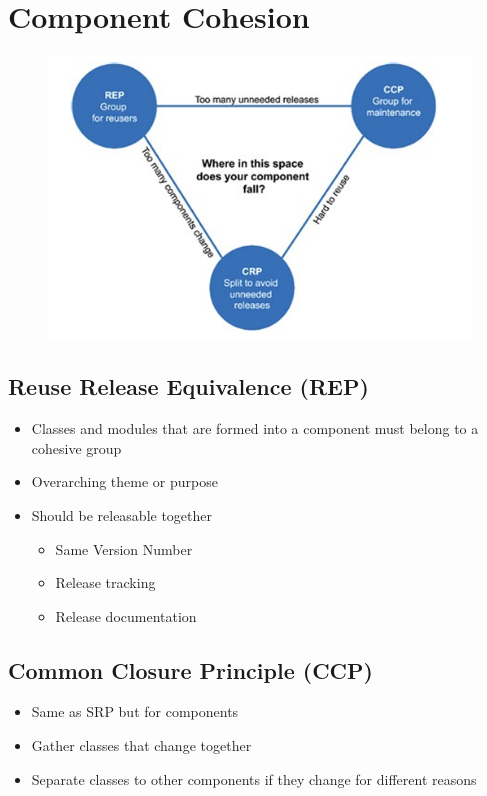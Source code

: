 \documentclass[../Main.tex]{subfiles}
\begin{document}
\section{Component Cohesion}
\begin{figure}[H]
    \centering
    \includegraphics[width=0.75\linewidth]{Images/cleanarch/component-cohesion.png}
\end{figure}

\subsection{Reuse Release Equivalence (REP)}
\begin{itemize}
    \item Classes and modules that are formed into a component must belong to a cohesive group
    \item Overarching theme or purpose
    \item Should be releasable together
        \begin{itemize}
            \item Same Version Number
            \item Release tracking
            \item Release documentation
        \end{itemize}
\end{itemize}

\subsection{Common Closure Principle (CCP)}
\begin{itemize}
    \item Same as SRP but for components
    \item Gather classes that change together
    \item Separate classes to other components if they change for different reasons
\end{itemize}
\end{document}

